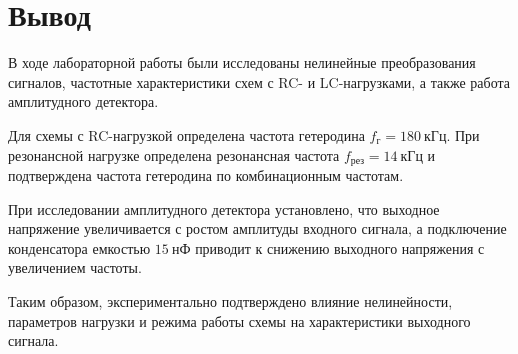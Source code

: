 \section{Вывод}

В ходе лабораторной работы были исследованы нелинейные преобразования сигналов, частотные характеристики схем с RC- и LC-нагрузками, а также работа амплитудного детектора.

Для схемы с RC-нагрузкой определена частота гетеродина $f_{\text{г}} = 180~\text{кГц}$. При резонансной нагрузке определена резонансная частота $f_{\text{рез}} = 14~\text{кГц}$ и подтверждена частота гетеродина по комбинационным частотам.

При исследовании амплитудного детектора установлено, что выходное напряжение увеличивается с ростом амплитуды входного сигнала, а подключение конденсатора емкостью $15~\text{нФ}$ приводит к снижению выходного напряжения с увеличением частоты.

Таким образом, экспериментально подтверждено влияние нелинейности, параметров нагрузки и режима работы схемы на характеристики выходного сигнала.